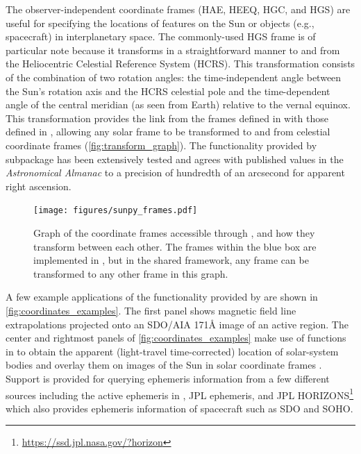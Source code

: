 The observer-independent coordinate frames (HAE, HEEQ, HGC, and HGS) are useful for specifying the locations of features on the Sun or objects (e.g., spacecraft) in interplanetary space.
The commonly-used HGS frame is of particular note because it transforms in a straightforward manner to and from the Heliocentric Celestial Reference System (HCRS).
This transformation consists of the combination of two rotation angles: the time-independent angle between the Sun's rotation axis and the HCRS celestial pole \citep[see][]{2007CeMDA..98..155S} and the time-dependent angle of the central meridian (as seen from Earth) relative to the vernal equinox.
This transformation provides the link from the frames defined in  with those defined in , allowing any solar frame to be transformed to and from celestial coordinate frames (\autoref{fig:transform_graph}).
The functionality provided by   subpackage has been extensively tested and agrees with published values in the \textit{Astronomical Almanac} to a precision of hundredth of an arcsecond for apparent right ascension.

\begin{figure}
    \centering
    \texttt{[image: figures/sunpy\_frames.pdf]}
    \caption{Graph of the coordinate frames accessible through , and how they transform between each other.
    The frames within the blue box are implemented in , but in the shared framework, any frame can be transformed to any other frame in this graph.}
    \label{fig:transform_graph}
\end{figure}

A few example applications of the functionality provided by  are shown in \autoref{fig:coordinates_examples}. 
The first panel shows magnetic field line extrapolations projected onto an SDO/AIA 171\AA{} image of an active region.
The center and rightmost panels of \autoref{fig:coordinates_examples} make use of functions in  to obtain the apparent (light-travel time-corrected) location of solar-system bodies and overlay them on images of the Sun in solar coordinate frames .
Support is  provided for querying ephemeris information from a few different sources including the active ephemeris in , JPL ephemeris, and JPL HORIZONS\footnote{\url{https://ssd.jpl.nasa.gov/?horizon}} which also provides ephemeris information of spacecraft such as SDO and SOHO.

